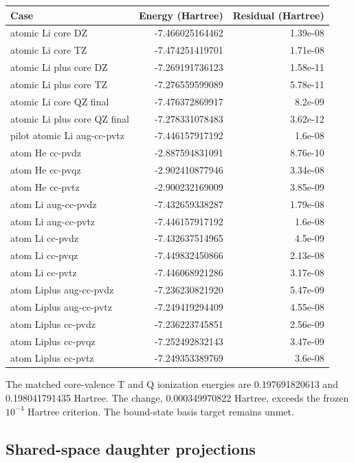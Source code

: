 \documentclass[
  10pt,
]{article}
\begin{document}
\begin{longtable}[]{@{}lrr@{}}
\toprule\noalign{}
Case & Energy (Hartree) & Residual (Hartree) \\
\midrule\noalign{}
\endhead
\bottomrule\noalign{}
\endlastfoot
atomic Li core DZ & -7.466025164462 & 1.39e-08 \\
atomic Li core TZ & -7.474251419701 & 1.71e-08 \\
atomic Li plus core DZ & -7.269191736123 & 1.58e-11 \\
atomic Li plus core TZ & -7.276559599089 & 5.78e-11 \\
atomic Li core QZ final & -7.476372869917 & 8.2e-09 \\
atomic Li plus core QZ final & -7.278331078483 & 3.62e-12 \\
pilot atomic Li aug-cc-pvtz & -7.446157917192 & 1.6e-08 \\
atom He cc-pvdz & -2.887594831091 & 8.76e-10 \\
atom He cc-pvqz & -2.902410877946 & 3.34e-08 \\
atom He cc-pvtz & -2.900232169009 & 3.85e-09 \\
atom Li aug-cc-pvdz & -7.432659338287 & 1.79e-08 \\
atom Li aug-cc-pvtz & -7.446157917192 & 1.6e-08 \\
atom Li cc-pvdz & -7.432637514965 & 4.5e-09 \\
atom Li cc-pvqz & -7.449832450866 & 2.13e-08 \\
atom Li cc-pvtz & -7.446068921286 & 3.17e-08 \\
atom Liplus aug-cc-pvdz & -7.236230821920 & 5.47e-09 \\
atom Liplus aug-cc-pvtz & -7.249419294409 & 4.55e-08 \\
atom Liplus cc-pvdz & -7.236223745851 & 2.56e-09 \\
atom Liplus cc-pvqz & -7.252492832143 & 3.47e-09 \\
atom Liplus cc-pvtz & -7.249353389769 & 3.6e-08 \\
\end{longtable}

The matched core-valence T and Q ionization energies are 0.197691820613
and 0.198041791435 Hartree. The change, 0.000349970822 Hartree, exceeds
the frozen \(10^{-4}\) Hartree criterion. The bound-state basis target
remains unmet.

\hypertarget{shared-space-daughter-projections}{%
\subsection{Shared-space daughter
projections}\label{shared-space-daughter-projections}}
\end{document}
